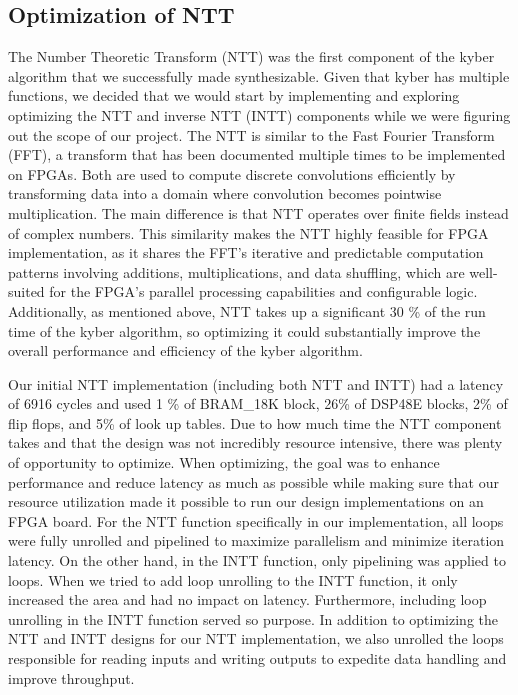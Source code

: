 
\subsection*{Optimization of NTT}

    The Number Theoretic Transform (NTT) was the first component of the kyber algorithm that we successfully made synthesizable.
Given that kyber has multiple functions, we decided that we would start by implementing and exploring optimizing the NTT and
inverse NTT (INTT) components while we were figuring out the scope of our project. The NTT is similar to the Fast Fourier 
Transform (FFT), a transform that has been documented multiple times to be implemented on FPGAs. Both are used to compute
discrete convolutions efficiently by transforming data into a domain where convolution becomes pointwise multiplication. 
The main difference is that NTT operates over finite fields instead of complex numbers. This similarity makes the NTT highly
feasible for FPGA implementation, as it shares the FFT's iterative and predictable computation patterns involving additions,
multiplications, and data shuffling, which are well-suited for the FPGA’s parallel processing capabilities and configurable logic.
Additionally, as mentioned above, NTT takes up a significant 30 \% of the run time of the kyber algorithm, so optimizing it could
substantially improve the overall performance and efficiency of the kyber algorithm.  
  
   Our initial NTT implementation (including both NTT and INTT) had a latency of 6916 cycles and used 1 \% of BRAM\_18K block,
26\% of DSP48E blocks, 2\% of  flip flops, and 5\% of look up tables. Due to how much time the NTT component takes and that the 
design was not incredibly resource intensive, there was plenty of opportunity to optimize. When optimizing, the goal was to
enhance performance and reduce latency as much as possible while making sure that our resource utilization made it possible to
run our design implementations on an FPGA board. For the NTT function specifically in our implementation, all loops were fully
unrolled and pipelined to maximize parallelism and minimize iteration latency. On the other hand, in the INTT function, only
pipelining was applied to loops. When we tried to add loop unrolling to the INTT function, it only increased the area and had
no impact on latency. Furthermore, including loop unrolling in the INTT function served so purpose. In addition to optimizing
the NTT and INTT designs for our NTT implementation, we also unrolled the loops responsible for reading inputs and writing outputs
to expedite data handling and improve throughput. 

